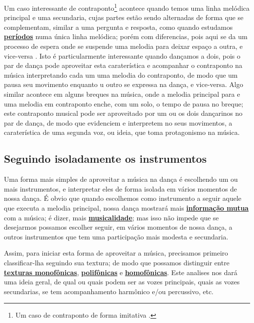 Um caso interessante de contraponto\footnote{Um 
caso de contraponto de forma imitativa \cite[pp. 100]{tragtenberg2002contraponto}.}
acontece quando temos uma linha melódica principal e uma secundaria, 
cujas partes estão sendo alternadas de forma que se complementam,
similar a uma pergunta e resposta, como quando estudamos 
\hyperref[sec:Periodo]{\textbf{períodos}} numa única linha melódica;
porém com diferencias, pois aqui se da um processo de espera onde se suspende 
uma melodia para deixar espaço 
a outra, e vice-versa \cite[pp. 100, 111]{tragtenberg2002contraponto}.
Isto é particularmente interessante quando dançamos a dois,
pois o par de dança pode aproveitar esta caraterística 
e acompanhar o contraponto na música interpretando cada um 
uma melodia do contraponto, 
de modo que um pausa seu movimento enquanto u outro se expressa na dança, e vice-versa.
Algo similar acontece em alguns breques na música, onde a melodia principal para 
e uma melodia em contraponto enche, com um solo, o tempo de pausa no breque;
este contraponto musical pode ser aproveitado por um ou os dois dançarinos no par de dança,
de modo que evidenciem e interpretem no seus movimentos, 
a caraterística de uma segunda voz, ou ideia, que toma protagonismo na música.

\subsection{Seguindo isoladamente os instrumentos}
\label{sec:seguindoinstrumentos}
Uma forma mais simples de aproveitar a música na dança é escolhendo um ou mais instrumentos,
e interpretar eles de forma isolada em vários momentos de nossa dança. 
É obvio que quando escolhemos como instrumento a seguir aquele que executa a melodia principal,
nossa dança mostrará mais \hyperref[sec:musicalidadeinfmutua]{\textbf{informação mutua}} com a música; é dizer, 
mais \hyperref[sec:musicalidadeinfmutua]{\textbf{musicalidade}};
mas isso não impede que se desejarmos possamos escolher  
seguir, em vários momentos de nossa dança,
a outros instrumentos que tem uma participação mais modesta e secundaria.

Assim, para iniciar esta forma de aproveitar a música, precisamos primeiro 
classificar-lha seguindo sua textura;
de modo que possamos distinguir entre
\hyperref[subsec:monofonica]{\textbf{texturas monofônicas}}, 
\hyperref[subsec:polifonica]{\textbf{polifônicas}} e
\hyperref[subsec:homofonica]{\textbf{homofônicas}}. 
Este analises nos dará uma ideia geral, 
de qual ou quais podem ser as vozes principais, quais as vozes secundarias,
se tem acompanhamento harmônico e/ou percussivo, etc.

